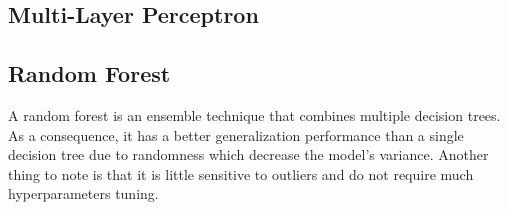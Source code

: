 \subsection{Multi-Layer Perceptron}

\subsection{Random Forest}

A random forest is an ensemble technique that combines multiple decision trees. As a consequence, it has a better generalization performance than a single decision tree due to randomness which decrease the model's variance. Another thing to note is that it is little sensitive to outliers and do not require much hyperparameters tuning.